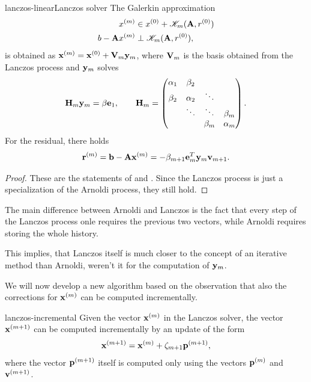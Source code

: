 \begin{Lemma*}{lanczos-linear}{Lanczos solver}
  The Galerkin approximation   \begin{align}
    x^{(m)} &\in x^{(0)} + \mathscr K_m(\mathbf A,r^{(0)})\\
    b-\mathbf A x^{(m)} &\perp \mathscr K_m(\mathbf A,r^{(0)}),
  \end{align}
  is obtained as $\mathbf x^{(m)} = \mathbf x^{(0)} + \mathbf V_m \mathbf y_m$, where $\mathbf V_m$ is the basis obtained from the Lanczos process and $\mathbf y_m$ solves
  \begin{gather}
    \mathbf H_m\mathbf y_m = \beta\mathbf e_1,
    \qquad \mathbf H_m =
    \begin{pmatrix}
      \alpha_1 & \beta_2\\
      \beta_2 & \alpha_2 & \ddots\\
      &\ddots&\ddots&\beta_m\\
      &&\beta_{m}&\alpha_m
    \end{pmatrix}.
  \end{gather}
  For the residual, there holds
  \begin{gather}
    \mathbf r^{(m)} = \mathbf b-\mathbf A\mathbf x^{(m)} = -\beta_{m+1} \mathbf e_m^T \mathbf y_m \mathbf v_{m+1}.
  \end{gather}
\end{Lemma*}

\begin{proof}
  These are the statements of
   and
  . Since the Lanczos
  process is just a specialization of the Arnoldi process, they still
  hold.
\end{proof}

\begin{remark}
  The main difference between Arnoldi and Lanczos is the fact that
  every step of the Lanczos process onle requires the previous two
  vectors, while Arnoldi requires storing the whole history.

  This implies, that Lanczos itself is much closer to the concept of
  an iterative method than Arnoldi, weren't it for the computation of
  $\mathbf y_m$.

  We will now develop a new algorithm based on the observation that
  also the corrections for $\mathbf x^{(m)}$ can be computed incrementally.
\end{remark}

\begin{Lemma}{lanczos-incremental}
  Given the vector $\mathbf x^{(m)}$ in the Lanczos solver, the vector
  $\mathbf x^{(m+1)}$ can be computed incrementally by an update of the form
  \begin{gather}
    \mathbf x^{(m+1)} = \mathbf x^{(m)} + \zeta_{m+1}\mathbf p^{(m+1)},
  \end{gather}
  where the vector $\mathbf p^{(m+1)}$ itself is computed only using the
  vectors $\mathbf p^{(m)}$ and $\mathbf v^{(m+1)}$.
\end{Lemma}

